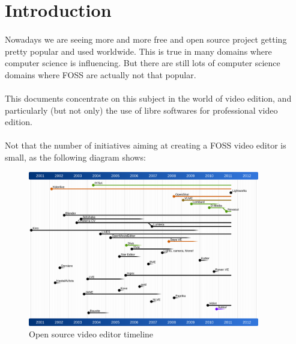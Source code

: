\newpage
\section{Introduction}
    \paragraph{}
        Nowadays we are seeing more and more free and open source project
        getting pretty popular and used worldwide. This is true in many
        domains where computer science is influencing. But there are
        still lots of computer science domains where FOSS are actually not that
        popular.

    \paragraph{}
        This documents concentrate on this subject in the world of video
        edition, and particularly (but not only) the use of libre softwares
        for professional video edition.

    \paragraph{}
        Not that the number of initiatives aiming at creating a FOSS video
        editor is small, as the following diagram shows:

        \begin{figure}[!htbp]
            \begin{center}
                \includegraphics[width=0.9\textwidth]{images/open-source-video-editor-timeline}
            \end{center}
            \caption{Open source video editor timeline}
            \label{Yes}
        \end{figure}

